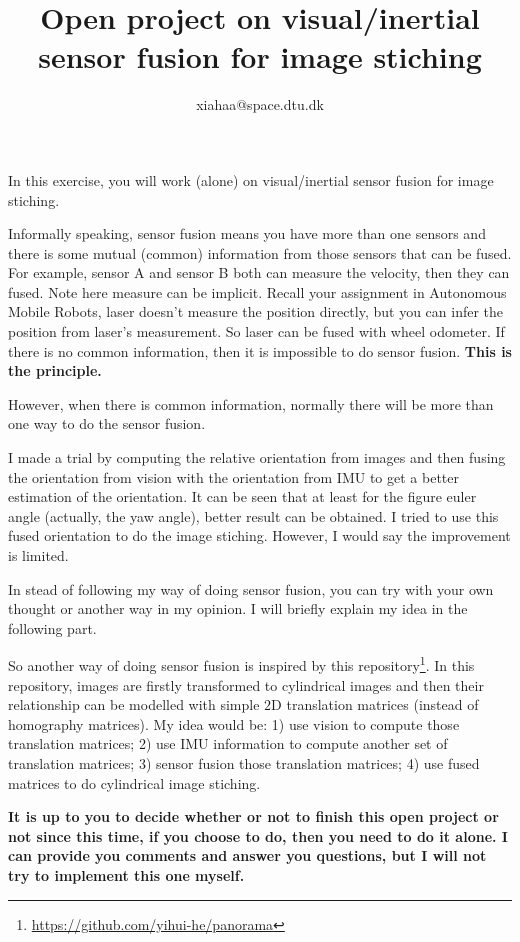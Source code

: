 \documentclass[a4paper]{article}
\begin{document}
\title{Open project on visual/inertial sensor fusion for image stiching}
\author{xiahaa@space.dtu.dk}
\maketitle%

In this exercise, you will work (alone) on visual/inertial sensor fusion for image stiching. 

Informally speaking, sensor fusion means you have more than one sensors and there is some mutual (common) information from those sensors that can be fused. For example, sensor A and sensor B both can measure the velocity, then they can fused. Note here measure can be implicit. Recall your assignment in Autonomous Mobile Robots, laser doesn't measure the position directly, but you can infer the position from laser's measurement. So laser can be fused with wheel odometer. If there is no common information, then it is impossible to do sensor fusion. \textbf{This is the principle.}

However, when there is common information, normally there will be more than one way to do the sensor fusion.

I made a trial by computing the relative orientation from images and then fusing the orientation from vision with the orientation from IMU to get a better estimation of the orientation. It can be seen that at least for the figure euler angle (actually, the yaw angle), better result can be obtained. I tried to use this fused orientation to do the image stiching. However, I would say the improvement is limited. 

In stead of following my way of doing sensor fusion, you can try with your own thought or another way in my opinion. I will briefly explain my idea in the following part. 

So another way of doing sensor fusion is inspired by this repository\footnote{\url{https://github.com/yihui-he/panorama}}. In this repository, images are firstly transformed to cylindrical images and then their relationship can be modelled with simple $2$D translation matrices (instead of homography matrices). My idea would be: 1) use vision to compute those translation matrices; 2) use IMU information to compute another set of translation matrices; 3) sensor fusion those translation matrices; 4) use fused matrices to do cylindrical image stiching. 

\textbf{It is up to you to decide whether or not to finish this open project or not since this time, if you choose to do, then you need to do it alone. I can provide you comments and answer you questions, but I will not try to implement this one myself.}
\end{document}
